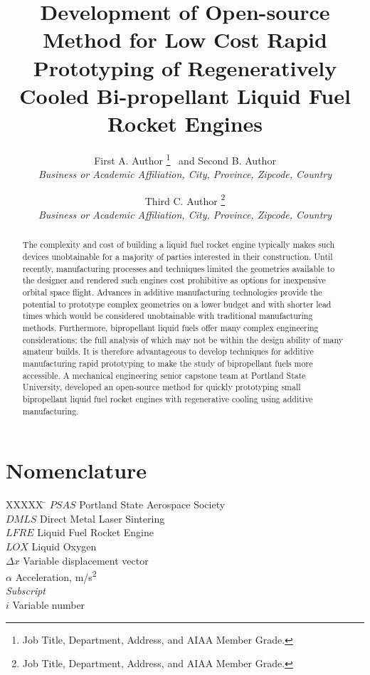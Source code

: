 \documentclass[]{aiaa-tc}%
\title{Development of Open-source Method for Low Cost Rapid Prototyping of Regeneratively Cooled Bi-propellant Liquid Fuel Rocket Engines}
\author{
  First A. Author%
    \thanks{Job Title, Department, Address, and AIAA Member Grade.}
  \ and Second B. Author\thanksibid{1}\\
  {\normalsize\itshape
   Business or Academic Affiliation, City, Province, Zipcode, Country}\\
  \and
  Third C. Author%
   \thanks{Job Title, Department, Address, and AIAA Member Grade.}\\
  {\normalsize\itshape
  Business or Academic Affiliation, City, Province, Zipcode, Country}
 }
\begin{document}
\maketitle

\begin{abstract}

The complexity and cost of building a liquid fuel rocket engine typically makes such devices unobtainable for a majority of parties interested in their construction. Until recently, manufacturing processes and techniques limited the geometries available to the designer and rendered such engines cost prohibitive as options for inexpensive orbital space flight. Advances in additive manufacturing technologies provide the potential to prototype complex geometries on a lower budget and with shorter lead times which would be considered unobtainable with traditional manufacturing methods. Furthermore, bipropellant liquid fuels offer many complex engineering considerations; the full analysis of which may not be within the design ability of many amateur builds. It is therefore advantageous to develop techniques for additive manufacturing rapid prototyping to make the study of bipropellant fuels more accessible. A mechanical engineering senior capstone team at Portland State University, developed an open-source method for quickly prototyping small bipropellant liquid fuel rocket engines with regenerative cooling using additive manufacturing.
\end{abstract}





\section*{Nomenclature} %

\begin{tabbing}
  XXXXX \= \kill%
  $PSAS$ \> Portland State Aerospace Society\\
  $DMLS$ \> Direct Metal Laser Sintering\\
  $LFRE$ \> Liquid Fuel Rocket Engine\\
  $LOX$ \> Liquid Oxygen\\

  $\Delta x$ \> Variable displacement vector \\
  $\alpha$ \> Acceleration, m/s\textsuperscript{2} \\[5pt]
  \textit{Subscript}\\
  $i$ \> Variable number \\
 \end{tabbing}
\end{document}
